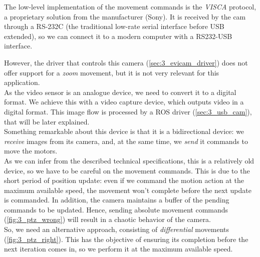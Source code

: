 		The low-level implementation of the movement commands is the \emph{VISCA} protocol, a proprietary solution from the manufacturer (Sony). It is received by the cam through a RS-232C (the traditional low-rate serial interface before USB extended), so we can connect it to a modern computer with a RS232-USB interface.

		However, the driver that controls this camera (\ref{sec:3_evicam_driver}) does not offer support for a \emph{zoom} movement, but it is not very relevant for this application.\\

		As the video sensor is an analogue device, we need to convert it to a digital format. We achieve this with a video capture device, which outputs video in a digital format. This image flow is processed by a ROS driver (\autoref{sec:3_usb_cam}), that will be later explained.\\

		Something remarkable about this device is that it is a bidirectional device: we \textit{receive} images from its camera, and, at the same time, we \textit{send} it commands to move the motors.\\
		
		As we can infer from the described technical specifications, this is a relatively old device, so we have to be careful on the movement commands. This is due to the short period of position update: even if we command the motion action at the maximum available speed, the movement won't complete before the next update is commanded. In addition, the camera maintains a buffer of the pending commands to be updated. Hence, sending absolute movement commands (\autoref{fig:3_ptz_wrong}) will result in a chaotic behavior of the camera.\\
		
		So, we need an alternative approach, consisting of \emph{differential} movements (\autoref{fig:3_ptz_right}). This has the objective of ensuring its completion before the next iteration comes in, so we perform it at the maximum available speed.

